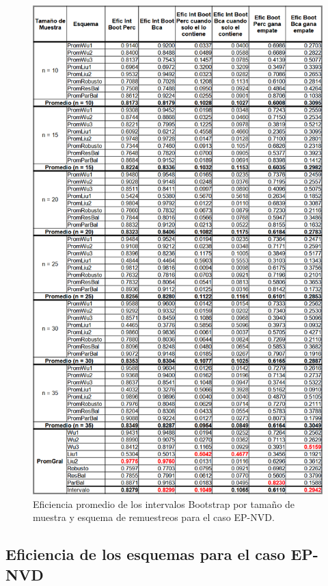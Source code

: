 \begin{figure}[ht] 
	\centering 
	\includegraphics[width=0.75\linewidth]{img/EP_NVD_Efic_Boots.png} 
	\caption{Eficiencia promedio de los intervalos Bootstrap por tamaño de muestra y esquema de remuestreos para el caso EP-NVD.} 
	\label{fig:EP_NVD_Boots}
\end{figure}

\subsection{Eficiencia de los esquemas para el caso EP-NVD}

